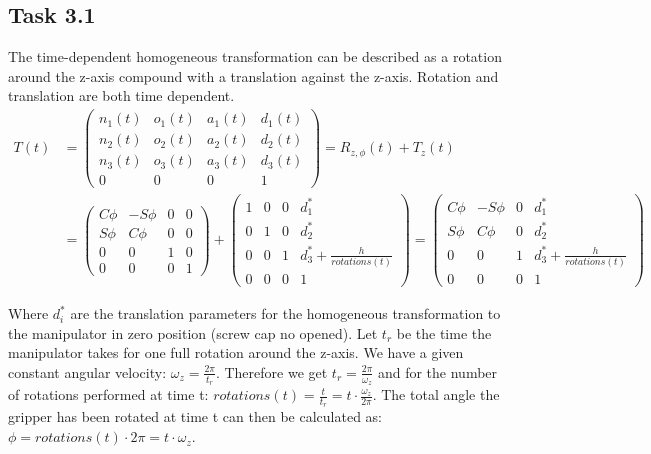 \subsection*{Task 3.1}

The time-dependent homogeneous transformation can be described as a rotation around the z-axis compound with a translation against the z-axis.
Rotation and translation are both time dependent.
\begin{align*}
T(t) &= 
\begin{pmatrix}
n_1(t) & o_1(t) & a_1(t) & d_1(t)\\
n_2(t) & o_2(t) & a_2(t) & d_2(t)\\
n_3(t) & o_3(t) & a_3(t) & d_3(t)\\
0 & 0 & 0 & 1
\end{pmatrix}
= R_{z,\phi}(t) + T_z(t)\\
&=
\begin{pmatrix}
C\phi & -S\phi & 0 & 0\\
S\phi & C\phi & 0 & 0\\
0 & 0 & 1 & 0\\
0 & 0 & 0 & 1
\end{pmatrix}
+
\begin{pmatrix}
1 & 0 & 0 & d_1^*\\
0 & 1 & 0 & d_2^*\\
0 & 0 & 1 & d_3^* + \frac{h}{rotations(t)} \\
0 & 0 & 0 & 1
\end{pmatrix}
=
\begin{pmatrix}
C\phi & -S\phi & 0 & d_1^*\\
S\phi & C\phi & 0 & d_2^*\\
0 & 0 & 1 & d_3^* + \frac{h}{rotations(t)} \\
0 & 0 & 0 & 1
\end{pmatrix}
\end{align*}

Where $d_i^*$ are the translation parameters for the homogeneous transformation to the manipulator in zero position (screw cap no opened).
Let $t_r$ be the time the manipulator takes for one full rotation around the z-axis.
We have a given constant angular velocity: $\omega_z = \frac{2\pi}{t_r}$. 
Therefore we get $t_r = \frac{2\pi}{\omega_z}$ and for the number of rotations performed at time t: $rotations(t) = \frac{t}{t_r} = t\cdot\frac{\omega_z}{2\pi}$.
The total angle the gripper has been rotated at time t can then be calculated as: $\phi = rotations(t) \cdot 2\pi = t\cdot\omega_z$.


